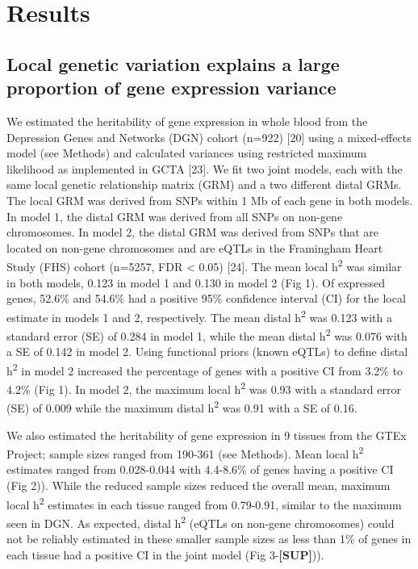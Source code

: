 \documentclass[]{article}
\begin{document}
\section{Results}\label{results}

\subsection{Local genetic variation explains a large proportion of gene
expression
variance}\label{local-genetic-variation-explains-a-large-proportion-of-gene-expression-variance}

We estimated the heritability of gene expression in whole blood from the
Depression Genes and Networks (DGN) cohort (n=922) {[}20{]} using a
mixed-effects model (see Methods) and calculated variances using
restricted maximum likelihood as implemented in GCTA {[}23{]}. We fit
two joint models, each with the same local genetic relationship matrix
(GRM) and a two different distal GRMs. The local GRM was derived from
SNPs within 1 Mb of each gene in both models. In model 1, the distal GRM
was derived from all SNPs on non-gene chromosomes. In model 2, the
distal GRM was derived from SNPs that are located on non-gene
chromosomes and are eQTLs in the Framingham Heart Study (FHS) cohort
(n=5257, FDR \textless{} 0.05) {[}24{]}. The mean local
h\textsuperscript{2} was similar in both models, 0.123 in model 1 and
0.130 in model 2 (Fig 1). Of expressed genes, 52.6\% and 54.6\% had a
positive 95\% confidence interval (CI) for the local estimate in models
1 and 2, respectively. The mean distal h\textsuperscript{2} was 0.123
with a standard error (SE) of 0.284 in model 1, while the mean distal
h\textsuperscript{2} was 0.076 with a SE of 0.142 in model 2. Using
functional priors (known eQTLs) to define distal h\textsuperscript{2} in
model 2 increased the percentage of genes with a positive CI from 3.2\%
to 4.2\% (Fig 1). In model 2, the maximum local h\textsuperscript{2} was
0.93 with a standard error (SE) of 0.009 while the maximum distal
h\textsuperscript{2} was 0.91 with a SE of 0.16.

We also estimated the heritability of gene expression in 9 tissues from
the GTEx Project; sample sizes ranged from 190-361 (see Methods). Mean
local h\textsuperscript{2} estimates ranged from 0.028-0.044 with
4.4-8.6\% of genes having a positive CI (Fig 2)). While the reduced
sample sizes reduced the overall mean, maximum local
h\textsuperscript{2} estimates in each tissue ranged from 0.79-0.91,
similar to the maximum seen in DGN. As expected, distal
h\textsuperscript{2} (eQTLs on non-gene chromosomes) could not be
reliably estimated in these smaller sample sizes as less than 1\% of
genes in each tissue had a positive CI in the joint model (Fig
3-\textbf{{[}SUP{]}})).
\end{document}
